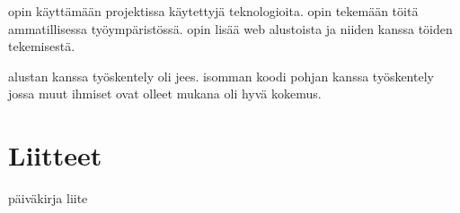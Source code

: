 \documentclass[11pt,a4paper,titlepage,oneside]{article}
\begin{document}
opin käyttämään projektissa käytettyjä teknologioita.
opin tekemään töitä ammatillisessa työympäristössä.
opin lisää web alustoista ja niiden kanssa töiden tekemisestä.
\medskip


alustan kanssa työskentely oli jees.
isomman koodi pohjan kanssa työskentely jossa muut ihmiset ovat olleet mukana oli hyvä kokemus.
\medskip

\fi








\newpage











\section{Liitteet}               %

päiväkirja liite
\end{document}
